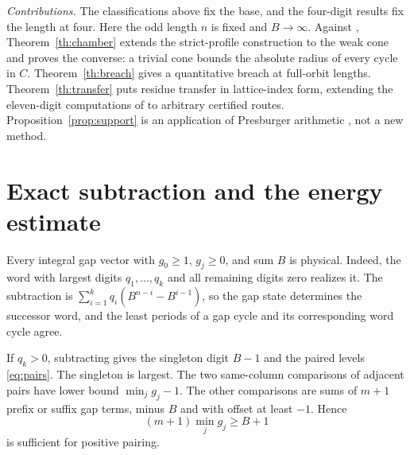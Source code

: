 \documentclass[11pt,reqno]{amsart}
\theoremstyle{definition}
\begin{document}
\emph{Contributions.} The classifications above fix the base, and the four-digit results fix the length at four. Here the odd length \(n\) is fixed and \(B\to\infty\). Against \cite{G9}, Theorem~\ref{th:chamber} extends the strict-profile construction to the weak cone and proves the converse: a trivial cone bounds the absolute radius of every cycle in \(C\). Theorem~\ref{th:breach} gives a quantitative breach at full-orbit lengths. Theorem~\ref{th:transfer} puts residue transfer in lattice-index form, extending the eleven-digit computations of \cite{G6,G7,G8} to arbitrary certified routes. Proposition~\ref{prop:support} is an application of Presburger arithmetic \cite{GS,BGW}, not a new method.

\section{Exact subtraction and the energy estimate}\label{sec:energy}
Every integral gap vector with \(g_0\ge1\), \(g_j\ge0\), and sum \(B\) is physical. Indeed, the word with largest digits \(q_1,\ldots,q_k\) and all remaining digits zero realizes it. The subtraction is \(\sum_{i=1}^k q_i(B^{n-i}-B^{i-1})\), so the gap state determines the successor word, and the least periods of a gap cycle and its corresponding word cycle agree.

If \(q_k>0\), subtracting gives the singleton digit \(B-1\) and the paired levels \eqref{eq:pairs}. The singleton is largest. The two same-column comparisons of adjacent pairs have lower bound \(\min_jg_j-1\). The other comparisons are sums of \(m+1\) prefix or suffix gap terms, minus \(B\) and with offset at least \(-1\). Hence
\begin{equation}\label{eq:guard}
 (m+1)\min_jg_j\ge B+1
\end{equation}
is sufficient for positive pairing.
\end{document}
